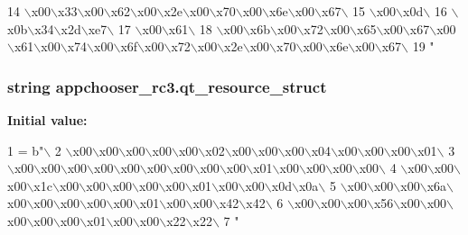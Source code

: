 \begin{DoxyCode}
14 \textcolor{stringliteral}{\(\backslash\)x00\(\backslash\)x33\(\backslash\)x00\(\backslash\)x62\(\backslash\)x00\(\backslash\)x2e\(\backslash\)x00\(\backslash\)x70\(\backslash\)x00\(\backslash\)x6e\(\backslash\)x00\(\backslash\)x67\(\backslash\)}
15 \textcolor{stringliteral}{\(\backslash\)x00\(\backslash\)x0d\(\backslash\)}
16 \textcolor{stringliteral}{\(\backslash\)x0b\(\backslash\)x34\(\backslash\)x2d\(\backslash\)xe7\(\backslash\)}
17 \textcolor{stringliteral}{\(\backslash\)x00\(\backslash\)x61\(\backslash\)}
18 \textcolor{stringliteral}{\(\backslash\)x00\(\backslash\)x6b\(\backslash\)x00\(\backslash\)x72\(\backslash\)x00\(\backslash\)x65\(\backslash\)x00\(\backslash\)x67\(\backslash\)x00\(\backslash\)x61\(\backslash\)x00\(\backslash\)x74\(\backslash\)x00\(\backslash\)x6f\(\backslash\)x00\(\backslash\)x72\(\backslash\)x00\(\backslash\)x2e\(\backslash\)x00\(\backslash\)x70\(\backslash\)x00\(\backslash\)x6e\(\backslash\)x00\(\backslash\)x67\(\backslash\)}
19 \textcolor{stringliteral}{"}
\end{DoxyCode}
\hypertarget{namespaceappchooser__rc3_aebfb3fad0913e409a65434be04c007f2}{}
\subsubsection[{qt\+\_\+resource\+\_\+struct}]{\setlength{\rightskip}{0pt plus 5cm}string appchooser\+\_\+rc3.\+qt\+\_\+resource\+\_\+struct}\label{namespaceappchooser__rc3_aebfb3fad0913e409a65434be04c007f2}
{\bfseries Initial value\+:}
\begin{DoxyCode}
1 = b\textcolor{stringliteral}{"\(\backslash\)}
2 \textcolor{stringliteral}{\(\backslash\)x00\(\backslash\)x00\(\backslash\)x00\(\backslash\)x00\(\backslash\)x00\(\backslash\)x02\(\backslash\)x00\(\backslash\)x00\(\backslash\)x00\(\backslash\)x04\(\backslash\)x00\(\backslash\)x00\(\backslash\)x00\(\backslash\)x01\(\backslash\)}
3 \textcolor{stringliteral}{\(\backslash\)x00\(\backslash\)x00\(\backslash\)x00\(\backslash\)x00\(\backslash\)x00\(\backslash\)x00\(\backslash\)x00\(\backslash\)x00\(\backslash\)x00\(\backslash\)x01\(\backslash\)x00\(\backslash\)x00\(\backslash\)x00\(\backslash\)x00\(\backslash\)}
4 \textcolor{stringliteral}{\(\backslash\)x00\(\backslash\)x00\(\backslash\)x00\(\backslash\)x1c\(\backslash\)x00\(\backslash\)x00\(\backslash\)x00\(\backslash\)x00\(\backslash\)x00\(\backslash\)x01\(\backslash\)x00\(\backslash\)x00\(\backslash\)x0d\(\backslash\)x0a\(\backslash\)}
5 \textcolor{stringliteral}{\(\backslash\)x00\(\backslash\)x00\(\backslash\)x00\(\backslash\)x6a\(\backslash\)x00\(\backslash\)x00\(\backslash\)x00\(\backslash\)x00\(\backslash\)x00\(\backslash\)x01\(\backslash\)x00\(\backslash\)x00\(\backslash\)x42\(\backslash\)x42\(\backslash\)}
6 \textcolor{stringliteral}{\(\backslash\)x00\(\backslash\)x00\(\backslash\)x00\(\backslash\)x56\(\backslash\)x00\(\backslash\)x00\(\backslash\)x00\(\backslash\)x00\(\backslash\)x00\(\backslash\)x01\(\backslash\)x00\(\backslash\)x00\(\backslash\)x22\(\backslash\)x22\(\backslash\)}
7 \textcolor{stringliteral}{"}
\end{DoxyCode}
